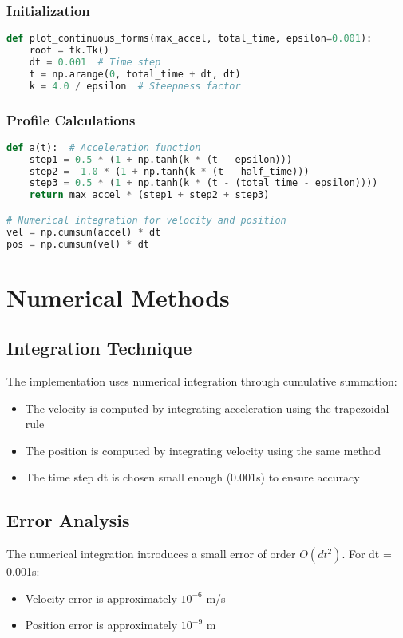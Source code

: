\documentclass[12pt,a4paper]{article}
\begin{document}
\subsubsection{Initialization}
\begin{lstlisting}[language=Python]
def plot_continuous_forms(max_accel, total_time, epsilon=0.001):
    root = tk.Tk()
    dt = 0.001  # Time step
    t = np.arange(0, total_time + dt, dt)
    k = 4.0 / epsilon  # Steepness factor
\end{lstlisting}

\subsubsection{Profile Calculations}
\begin{lstlisting}[language=Python]
def a(t):  # Acceleration function
    step1 = 0.5 * (1 + np.tanh(k * (t - epsilon)))
    step2 = -1.0 * (1 + np.tanh(k * (t - half_time)))
    step3 = 0.5 * (1 + np.tanh(k * (t - (total_time - epsilon))))
    return max_accel * (step1 + step2 + step3)

# Numerical integration for velocity and position
vel = np.cumsum(accel) * dt
pos = np.cumsum(vel) * dt
\end{lstlisting}

\section{Numerical Methods}

\subsection{Integration Technique}
The implementation uses numerical integration through cumulative summation:
\begin{itemize}
\item The velocity is computed by integrating acceleration using the trapezoidal rule
\item The position is computed by integrating velocity using the same method
\item The time step dt is chosen small enough (0.001s) to ensure accuracy
\end{itemize}

\subsection{Error Analysis}
The numerical integration introduces a small error of order $O(dt^2)$. For dt = 0.001s:
\begin{itemize}
\item Velocity error is approximately $10^{-6}$ m/s
\item Position error is approximately $10^{-9}$ m
\end{itemize}
\end{document}
